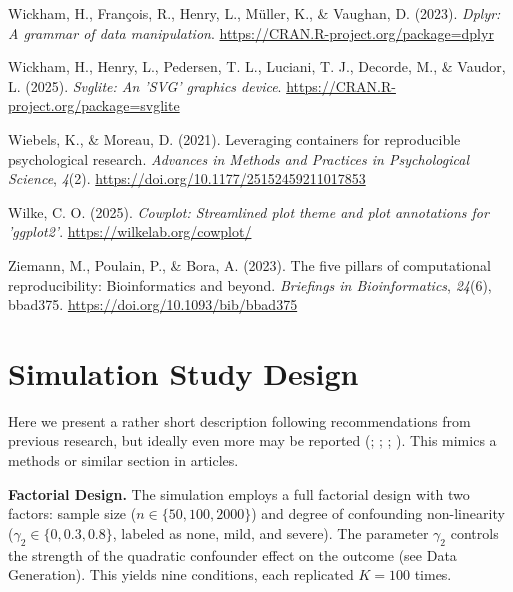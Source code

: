 \documentclass[
  man,
  longtable,
  nolmodern,
  notxfonts,
  notimes,
  colorlinks=true,linkcolor=blue,citecolor=blue,urlcolor=blue]{apa7}
\newlength{\cslhangindent}
\newenvironment{CSLReferences}[2] %
 {\begin{list}{}{%
  \setlength{\itemindent}{0pt}
  \setlength{\leftmargin}{0pt}
  \setlength{\parsep}{0pt}
  \ifodd #1
   \setlength{\leftmargin}{\cslhangindent}
   \setlength{\itemindent}{-1\cslhangindent}
  \fi
  \setlength{\itemsep}{#2\baselineskip}}}
 {\end{list}}
\begin{document}
\begin{CSLReferences}{1}{0}
Wickham, H., François, R., Henry, L., Müller, K., \& Vaughan, D. (2023).
\emph{Dplyr: A grammar of data manipulation}.
\url{https://CRAN.R-project.org/package=dplyr}

Wickham, H., Henry, L., Pedersen, T. L., Luciani, T. J., Decorde, M., \&
Vaudor, L. (2025). \emph{Svglite: An 'SVG' graphics device}.
\url{https://CRAN.R-project.org/package=svglite}

Wiebels, K., \& Moreau, D. (2021). Leveraging containers for
reproducible psychological research. \emph{Advances in Methods and
Practices in Psychological Science}, \emph{4}(2).
\url{https://doi.org/10.1177/25152459211017853}

Wilke, C. O. (2025). \emph{Cowplot: Streamlined plot theme and plot
annotations for 'ggplot2'}. \url{https://wilkelab.org/cowplot/}

Ziemann, M., Poulain, P., \& Bora, A. (2023). The five pillars of
computational reproducibility: Bioinformatics and beyond.
\emph{Briefings in Bioinformatics}, \emph{24}(6), bbad375.
\url{https://doi.org/10.1093/bib/bbad375}

\end{CSLReferences}

\appendix

\section{Simulation Study Design}\label{apx-simulation-study-design}

Here we present a rather short description following recommendations
from previous research, but ideally even more may be reported
(;
;
;
). This mimics a
methods or similar section in articles.

\textbf{Factorial Design.} The simulation employs a full factorial
design with two factors: sample size (\(n \in \{50, 100, 2000\}\)) and
degree of confounding non-linearity (\(\gamma_2 \in \{0, 0.3, 0.8\}\),
labeled as none, mild, and severe). The parameter \(\gamma_2\) controls
the strength of the quadratic confounder effect on the outcome (see Data
Generation). This yields nine conditions, each replicated \(K = 100\)
times.
\end{document}
